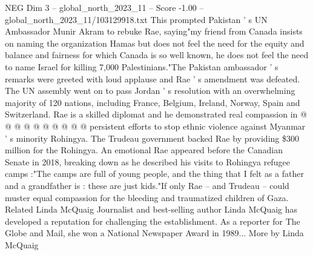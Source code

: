 \begin{textsample}{NEG Dim 3 – global\_north\_2023\_11 – Score -1.00 – global\_north\_2023\_11/103129918.txt}
This prompted Pakistan ' s UN Ambassador Munir Akram to rebuke Rae, saying"my friend from Canada insists on naming the organization Hamas but does not feel the need for the equity and balance and fairness for which Canada is so well known, he does not feel the need to name Israel for killing 7,000 Palestinians."The Pakistan ambassador ' s remarks were greeted with loud applause and Rae ' s amendment was defeated.
The UN assembly went on to pass Jordan ' s resolution with an overwhelming majority of 120 nations, including France, Belgium, Ireland, Norway, Spain and Switzerland.
Rae is a skilled diplomat and he demonstrated real compassion in @ @ @ @ @ @ @ @ @ @ persistent efforts to stop ethnic violence against Myanmar ' s minority Rohingya.
The Trudeau government backed Rae by providing \$300 million for the Rohingya.
An emotional Rae appeared before the Canadian Senate in 2018, breaking down as he described his visits to Rohingya refugee camps :"The camps are full of young people, and the thing that I felt as a father and a grandfather is : these are just kids."If only Rae -- and Trudeau -- could muster equal compassion for the bleeding and traumatized children of Gaza.
Related Linda McQuaig Journalist and best-selling author Linda McQuaig has developed a reputation for challenging the establishment.
As a reporter for The Globe and Mail, she won a National Newspaper Award in 1989...
More by Linda McQuaig

\end{textsample}
